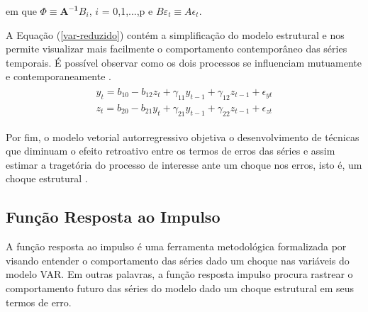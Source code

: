 \noindent em que $\Phi \equiv \mathbf{A^{-1}}B_i$, $i$ = 0,1,...,p e $B\varepsilon_t \equiv A\epsilon_t$.

A Equação (\ref{var-reduzido}) contém a simplificação do modelo estrutural e nos permite visualizar mais facilmente o comportamento contemporâneo das séries temporais. É possível observar como os dois processos se influenciam mutuamente e contemporaneamente \cite{enders}.
\begin{align}\label{var-reduzido}
    \begin{split}
    y_t = b_{10} - b_{12}z_t + \gamma_{11}y_{t-1} + \gamma_{12}z_{t-1} + \epsilon_{yt} \\
    z_t = b_{20} - b_{21}y_t + \gamma_{21}y_{t-1} + \gamma_{22}z_{t-1} + \epsilon_{zt}
    \end{split}
\end{align}

Por fim, o modelo vetorial autorregressivo objetiva o desenvolvimento de técnicas que diminuam o efeito retroativo entre os termos de erros das séries e assim estimar a tragetória do processo de interesse ante um choque nos erros, isto é, um choque estrutural \cite{bueno}.

\subsection{Função Resposta ao Impulso}

A função resposta ao impulso é uma ferramenta metodológica formalizada por  visando entender o comportamento das séries dado um choque nas variáveis do modelo VAR. Em outras palavras, a função resposta impulso procura rastrear o comportamento futuro das séries do modelo dado um choque estrutural em seus termos de erro. 

